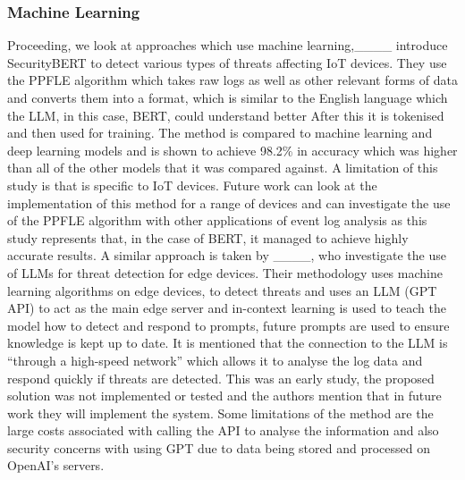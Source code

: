 \subsubsection{Machine Learning}
Proceeding, we look at approaches which use machine learning,____ introduce SecurityBERT to detect various types of threats affecting IoT devices. They use the PPFLE algorithm which takes raw logs as well as other relevant forms of data and converts them into a format, which is similar to the English language which the LLM, in this case, BERT, could understand better After this it is tokenised and then used for training. The method is compared to machine learning and deep learning models and is shown to achieve 98.2\% in accuracy which was higher than all of the other models that it was compared against. A limitation of this study is that is specific to IoT devices. Future work can look at the implementation of this method for a range of devices and can investigate the use of the PPFLE algorithm with other applications of event log analysis as this study represents that, in the case of BERT, it managed to achieve highly accurate results. A similar approach is taken by ____, who investigate the use of LLMs for threat detection for edge devices. Their methodology uses machine learning algorithms on edge devices, to detect threats and uses an LLM (GPT API) to act as the main edge server and in-context learning is used to teach the model how to detect and respond to prompts, future prompts are used to ensure knowledge is kept up to date. It is mentioned that the connection to the LLM is ``through a high-speed network'' which allows it to analyse the log data and respond quickly if threats are detected. This was an early study, the proposed solution was not implemented or tested and the authors mention that in future work they will implement the system. Some limitations of the method are the large costs associated with calling the API to analyse the information and also security concerns with using GPT due to data being stored and processed on OpenAI's servers.


